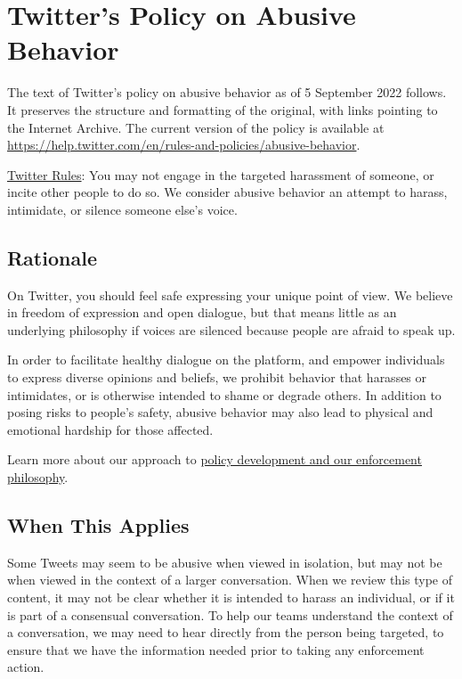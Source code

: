 
\newpage
\section{Twitter's Policy on Abusive Behavior}
\label{adx:twitter:abusive-behavior}

The text of Twitter's policy on abusive behavior as of 5 September 2022 follows.
It preserves the structure and formatting of the original, with links pointing
to the Internet Archive. The current version of the policy is available at
\url{https://help.twitter.com/en/rules-and-policies/abusive-behavior}.

\sectionbreak

\noindent\href{https://web.archive.org/web/20220905021323/https://help.twitter.com/en/rules-and-policies/twitter-rules.html}{Twitter
Rules}: You may not engage in the targeted harassment of someone, or incite
other people to do so. We consider abusive behavior an attempt to harass,
intimidate, or silence someone else's voice.


\subsection{Rationale}

On Twitter, you should feel safe expressing your unique point of view. We
believe in freedom of expression and open dialogue, but that means little as an
underlying philosophy if voices are silenced because people are afraid to speak
up.

In order to facilitate healthy dialogue on the platform, and empower individuals
to express diverse opinions and beliefs, we prohibit behavior that harasses or
intimidates, or is otherwise intended to shame or degrade others. In addition to
posing risks to people's safety, abusive behavior may also lead to physical and
emotional hardship for those affected.

Learn more about our approach to
\href{https://web.archive.org/web/20220905021323/https://help.twitter.com/en/rules-and-policies/enforcement-philosophy.html}{policy
development and our enforcement philosophy}.


\subsection{When This Applies}

Some Tweets may seem to be abusive when viewed in isolation, but may not be when
viewed in the context of a larger conversation. When we review this type of
content, it may not be clear whether it is intended to harass an individual, or
if it is part of a consensual conversation. To help our teams understand the
context of a conversation, we may need to hear directly from the person being
targeted, to ensure that we have the information needed prior to taking any
enforcement action.

